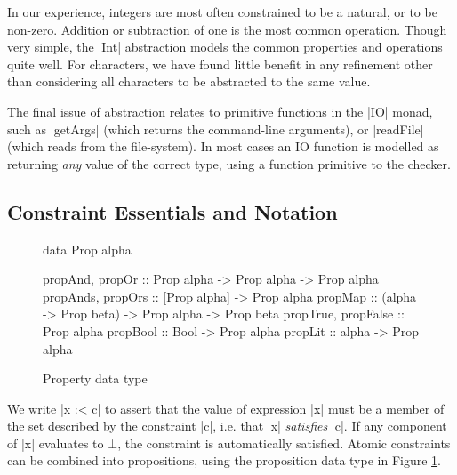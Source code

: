\documentclass[preprint]{sigplanconf}
\begin{document}
In our experience, integers are most often constrained to be a natural, or to be non-zero. Addition or subtraction of one is the most common operation. Though very simple, the |Int| abstraction models the common properties and operations quite well. For characters, we have found little benefit in any refinement other than considering all characters to be abstracted to the same value.

\begin{comment}
Possible abstractions of characters include:

\ignore\begin{code}
data Char = Char
data Char = Alpha | Digit | White | Other
data Char = 'A' .. 'Z' | 'a' .. 'z' | '0' .. '9' | Other
data Char = '\0' | '\1' | '\2' ..
\end{code}

\noindent Catch employs the first abstraction by default, but provides a flag to allow alternatives. In practice, few additional programs are proven safe with a more refined character abstraction.
\end{comment}

The final issue of abstraction relates to primitive functions in the |IO| monad, such as |getArgs| (which returns the command-line arguments), or |readFile| (which reads from the file-system). In most cases an IO function is modelled as returning \textit{any} value of the correct type, using a function primitive to the checker.

\subsection{Constraint Essentials and Notation}
\label{sec:constraints}

\begin{figure}
\begin{code}
data Prop alpha

propAnd, propOr           :: Prop alpha -> Prop alpha -> Prop alpha
propAnds, propOrs         :: [Prop alpha] -> Prop alpha
propMap                   :: (alpha -> Prop beta) -> Prop alpha -> Prop beta
propTrue, propFalse       :: Prop alpha
propBool                  :: Bool -> Prop alpha
propLit                   :: alpha -> Prop alpha
\end{code}
\caption{Property data type}
\label{fig:prop}
\end{figure}

We write |x :< c| to assert that the value of expression |x| must be a member of the set described by the constraint |c|, i.e. that |x| \textit{satisfies} |c|. If any component of |x| evaluates to $\bot{}$, the constraint is automatically satisfied. Atomic constraints can be combined into propositions, using the proposition data type in Figure \ref{fig:prop}.
\end{document}
